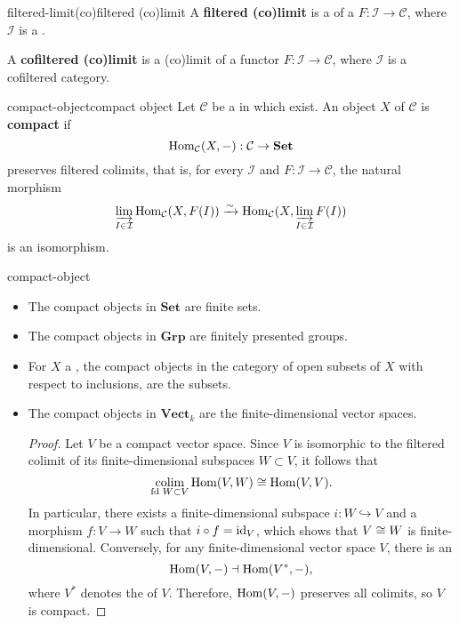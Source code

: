 \begin{topic}{filtered-limit}{(co)filtered (co)limit}
    A \textbf{filtered (co)limit} is a  of a  $F : \mathcal{I} \to \mathcal{C}$, where $\mathcal{I}$ is a .
    
    A \textbf{cofiltered (co)limit} is a (co)limit of a functor $F : \mathcal{I} \to \mathcal{C}$, where $\mathcal{I}$ is a cofiltered category.
\end{topic}

\begin{topic}{compact-object}{compact object}
    Let $\mathcal{C}$ be a   in which  exist. An object $X$ of $\mathcal{C}$ is \textbf{compact} if
    \[ \operatorname{Hom}_\mathcal{C}(X, -) : \mathcal{C} \to \textbf{Set} \]
    preserves filtered colimits, that is, for every  $\mathcal{I}$ and  $F : \mathcal{I} \to \mathcal{C}$, the natural morphism
    \[ \varinjlim_{I \in \mathcal{I}} \operatorname{Hom}_\mathcal{C}(X, F(I)) \xrightarrow{\sim} \operatorname{Hom}_\mathcal{C}(X, \varinjlim_{I \in \mathcal{I}} F(I)) \]
    is an isomorphism.
\end{topic}

\begin{example}{compact-object}
    \begin{itemize}
        \item The compact objects in $\textbf{Set}$ are finite sets.
        \item The compact objects in $\textbf{Grp}$ are finitely presented groups.
        \item For $X$ a , the compact objects in the category of open subsets of $X$ with respect to inclusions, are the  subsets.
        \item The compact objects in $\textbf{Vect}_k$ are the finite-dimensional vector spaces.
        \begin{proof}
            Let $V$ be a compact vector space. Since $V$ is isomorphic to the filtered colimit of its finite-dimensional subspaces $W \subset V$, it follows that
            \[ \underset{\textup{fd } W \subset V}{\operatorname{colim}} \operatorname{Hom}(V, W) \cong \operatorname{Hom}(V, V) . \]
            In particular, there exists a finite-dimensional subspace $i : W \hookrightarrow V$ and a morphism $f : V \to W$ such that $i \circ f = \textup{id}_V$, which shows that $V \cong W$ is finite-dimensional. Conversely, for any finite-dimensional vector space $V$, there is an 
            \[ \operatorname{Hom}(V, -) \dashv \operatorname{Hom}(V^*, -) , \]
            where $V^*$ denotes the  of $V$. Therefore, $\operatorname{Hom}(V, - )$ preserves all colimits, so $V$ is compact.
        \end{proof}
    \end{itemize}
\end{example}

